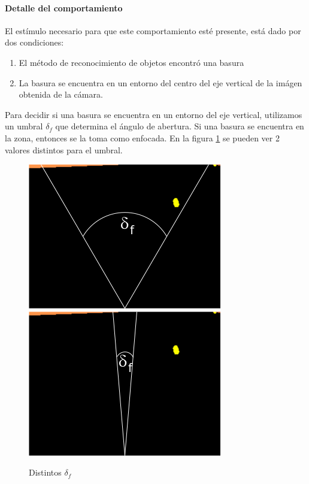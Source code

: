 \paragraph{Detalle del comportamiento}
El est\'imulo necesario para que este comportamiento est\'e presente, est\'a
dado por dos condiciones:
\begin{enumerate}
\item El m\'etodo de reconocimiento de objetos encontr\'o una basura
\item La basura se encuentra en un entorno del centro del eje vertical de la
		im\'agen obtenida de la c\'amara.
\end{enumerate}
Para decidir si una basura se encuentra en un entorno del eje vertical,
utilizamos un umbral $\delta_f$ que determina el \'angulo de abertura.
Si una basura se encuentra en la zona, entonces se la toma como enfocada.
En la figura \ref{fig:focusAngles} se pueden ver 2 valores distintos para el
umbral.
\begin{figure}[htp]
\begin{center}
\includegraphics[scale=0.5]{comportamientos/figures/garbageFocusAngle.png}
\includegraphics[scale=0.5]{comportamientos/figures/garbageFocusAngleTwo.png}
\caption{Distintos $\delta_f$}
\label{fig:focusAngles}
\end{center}
\end{figure}


